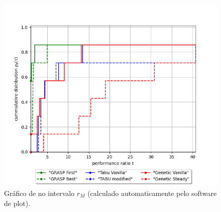 \begin{figure}[H]
    \centering
    \includegraphics[width=\textwidth]{figure/performance_profile/performance_profile_thmax_None.png}
    \caption{Gráfico de \perfprof no intervalo $r_M$ (calculado automaticamente pelo software de plot).}
    \label{fig:performance-profile-max}
\end{figure}
